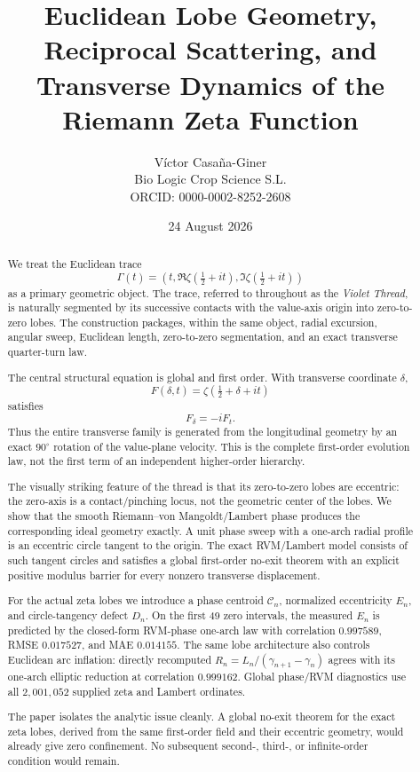 \documentclass[11pt]{article}
\title{\textbf{Euclidean Lobe Geometry, Reciprocal Scattering, and Transverse Dynamics of the Riemann Zeta Function}}
\author{Víctor Casaña-Giner\\
\small Bio Logic Crop Science S.L.\\
\small ORCID: 0000-0002-8252-2608}
\date{24 August 2026}
\theoremstyle{definition}
\begin{document}
\maketitle

\begin{abstract}
We treat the Euclidean trace
\[
\Gamma(t)=\left(t,\Re\zeta\!\left(\tfrac12+it\right),
                 \Im\zeta\!\left(\tfrac12+it\right)\right)
\]
as a primary geometric object.  The trace, referred to throughout as the
\emph{Violet Thread}, is naturally segmented by its successive contacts with
the value-axis origin into zero-to-zero lobes.  The construction packages,
within the same object, radial excursion, angular sweep, Euclidean length,
zero-to-zero segmentation, and an exact transverse quarter-turn law.

The central structural equation is global and first order.  With transverse
coordinate $\delta$,
\[
F(\delta,t)=\zeta\!\left(\tfrac12+\delta+it\right)
\]
satisfies
\[
F_\delta=-iF_t.
\]
Thus the entire transverse family is generated from the longitudinal geometry
by an exact $90^\circ$ rotation of the value-plane velocity.  This is the
complete first-order evolution law, not the first term of an independent
higher-order hierarchy.

The visually striking feature of the thread is that its zero-to-zero lobes
are eccentric: the zero-axis is a contact/pinching locus, not the geometric
center of the lobes.  We show that the smooth Riemann--von Mangoldt/Lambert
phase produces the corresponding ideal geometry exactly.  A unit phase sweep
with a one-arch radial profile is an eccentric circle tangent to the origin.
The exact RVM/Lambert model consists of such tangent circles and satisfies a
global first-order no-exit theorem with an explicit positive modulus barrier
for every nonzero transverse displacement.

For the actual zeta lobes we introduce a phase centroid $\mathcal C_n$,
normalized eccentricity $E_n$, and circle-tangency defect $D_n$.  On the first
49 zero intervals, the measured $E_n$ is predicted by the closed-form
RVM-phase one-arch law with correlation $0.997589$, RMSE $0.017527$, and MAE
$0.014155$.  The same lobe architecture also controls Euclidean arc inflation:
directly recomputed $R_n=L_n/(\gamma_{n+1}-\gamma_n)$ agrees with its
one-arch elliptic reduction at correlation $0.999162$.  Global phase/RVM
diagnostics use all $2{,}001{,}052$ supplied zeta and Lambert ordinates.

The paper isolates the analytic issue cleanly.  A global no-exit theorem for
the exact zeta lobes, derived from the same first-order field and their
eccentric geometry, would already give zero confinement.  No subsequent
second-, third-, or infinite-order condition would remain.
\end{abstract}
\end{document}
